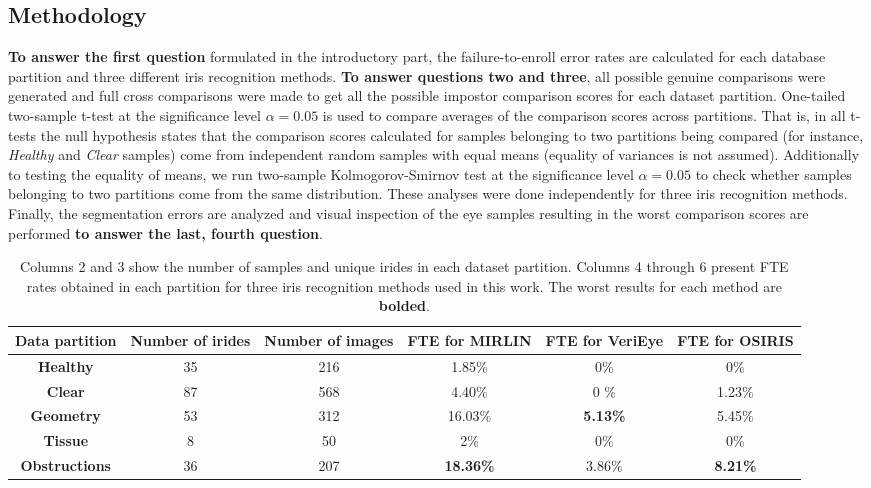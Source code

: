 \documentclass[10pt,twocolumn,letterpaper]{article}
\begin{document}
\subsection{Methodology}

{\bf To answer the first question} formulated in the introductory part, the failure-to-enroll error rates are calculated for each database partition and three different iris recognition methods. {\bf To answer questions two and three}, all possible genuine comparisons were generated and full cross comparisons were made to get all the possible impostor comparison scores for each dataset partition. One-tailed two-sample t-test at the significance level $\alpha = 0.05$ is used to compare averages of the comparison scores across partitions. That is, in all t-tests the null hypothesis states that the comparison scores calculated for samples belonging to two partitions being compared (for instance, \emph{Healthy} and \emph{Clear} samples) come from independent random samples with equal means (equality of variances is not assumed). Additionally to testing the equality of means, we run two-sample Kolmogorov-Smirnov test at the significance level $\alpha = 0.05$ to check whether samples belonging to two partitions come from the same distribution. These analyses were done independently for three iris recognition methods. Finally, the segmentation errors are analyzed and visual inspection of the eye samples resulting in the worst comparison scores are performed {\bf to answer the last, fourth question}.

\begin{table*}[!ht]
\renewcommand{\arraystretch}{1.1}
\caption{Columns 2 and 3 show the number of samples and unique irides in each dataset partition. Columns 4 through 6 present FTE rates obtained in each partition for three iris recognition methods used in this work. The worst results for each method are \textbf{bolded}.}
\label{table:FTE}
\centering\footnotesize
\begin{tabular}[t]{|c|c|c|c|c|c|}
\hline
\textbf{Data partition} & \textbf{Number of irides} & \textbf{Number of images} & {FTE for MIRLIN} & {FTE for VeriEye} & {FTE for OSIRIS} \\
\hline
\hline
\textbf{Healthy} & 35 & 216 & 1.85\% & 0\% & 0\% \\
\hline
\textbf{Clear} & 87 & 568 & 4.40\%  & 0	\% & 1.23\% \\
\hline
\textbf{Geometry} & 53 & 312 & 16.03\% & \textbf{5.13\%} & 5.45\% \\
\hline
\textbf{Tissue} & 8 & 50 & 2\% & 0\% & 0\% \\
\hline
\textbf{Obstructions} & 36 & 207 & \textbf{18.36\%}  &  3.86\% & \textbf{8.21\%} \\
\hline
\end{tabular}
\end{table*}
\end{document}
